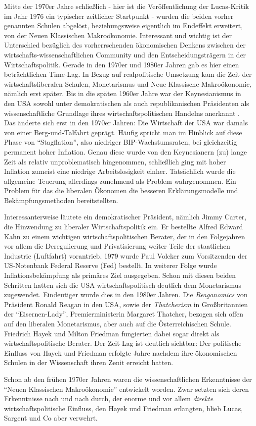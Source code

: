 Mitte der 1970er Jahre schließlich - hier ist die Veröffentlichung der Lucas-Kritik im Jahr 1976 ein typischer zeitlicher Startpunkt - wurden die beiden vorher genannten Schulen abgelöst, beziehungsweise eigentlich im Endeffekt erweitert, von der Neuen Klassischen Makroökonomie. Interessant und wichtig ist der Unterschied bezüglich des vorherrschenden ökonomischen Denkens zwischen der wirtschafts-wissenschaftlichen Community und den Entscheidungsträgern in der Wirtschaftspolitik. Gerade in den 1970er und 1980er Jahren gab es hier einen beträchtlichen Time-Lag. In Bezug auf realpolitische Umsetzung kam die Zeit der wirtschaftsliberalen Schulen, Monetarismus und Neue Klassische Makroökonomie, nämlich erst später. Bis in die späten 1960er Jahre war der Keynesianismus in den USA sowohl unter demokratischen als auch republikanischen Präsidenten als wissenschaftliche Grundlage ihres wirtschaftspolitischen Handelns anerkannt \parencite[S. 12]{Woodford1999}. Das änderte sich erst in den 1970er Jahren: Die Wirtschaft der USA war damals von einer Berg-und-Talfahrt geprägt. Häufig spricht man im Hinblick auf diese Phase von "`Stagflation"', also niedriger BIP-Wachstumsraten, bei gleichzeitig permanent hoher Inflation. Genau diese wurde von den Keynesianern (zu) lange Zeit als relativ unproblematisch hingenommen, schließlich ging mit hoher Inflation zumeist eine niedrige Arbeitslosigkeit einher. Tatsächlich wurde die allgemeine Teuerung allerdings zunehmend als Problem wahrgenommen. Ein Problem für das die liberalen Ökonomen die besseren Erklärungsmodelle und Bekämpfungsmethoden bereitstellten. 

Interessanterweise läutete ein demokratischer Präsident, nämlich Jimmy Carter, die Hinwendung zu liberaler Wirtschaftspolitik ein. Er bestellte Alfred Edward Kahn zu einem wichtigen wirtschaftspolitischen Berater, der in den Folgejahren vor allem die Deregulierung und Privatisierung weiter Teile der staatlichen Industrie (Luftfahrt) vorantrieb. 1979 wurde Paul Volcker zum Vorsitzenden der US-Notenbank Federal Reserve (Fed) bestellt. In weiterer Folge wurde Inflationsbekämpfung als primäres Ziel ausgegeben. Schon mit diesen beiden Schritten hatten sich die USA wirtschaftspolitisch deutlich dem Monetarismus zugewendet. Eindeutiger wurde dies in den 1980er Jahren. Die \textit{Reaganomics} von Präsident Ronald Reagan in den USA, sowie der \textit{Thatcherism} in Großbritannien der "`Eisernen-Lady"', Premierministerin Margaret Thatcher,  bezogen sich offen auf den liberalen Monetarismus, aber auch auf die Österreichischen Schule. Friedrich Hayek und Milton Friedman fungierten dabei sogar direkt als wirtschaftspolitische Berater. Der Zeit-Lag ist deutlich sichtbar: Der politische Einfluss von Hayek und Friedman erfolgte Jahre nachdem ihre ökonomischen Schulen in der Wissenschaft ihren Zenit erreicht hatten.

Schon ab den frühen 1970er Jahren waren die wissenschaftlichen Erkenntnisse der "`Neuen Klassischen Makroökonomie"' entwickelt worden. Zwar setzten sich deren Erkenntnisse nach und nach durch, der enorme und vor allem \textit{direkte} wirtschaftspolitische Einfluss, den Hayek und Friedman erlangten, blieb Lucas, Sargent und Co aber verwehrt.

